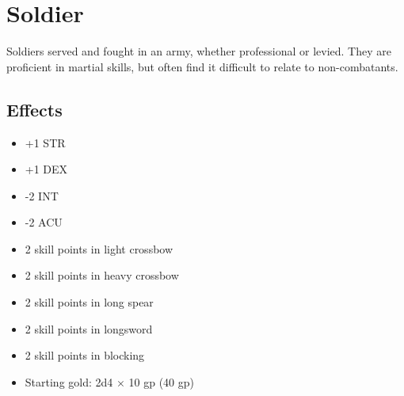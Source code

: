 \section{Soldier}\label{background:soldier}
Soldiers served and fought in an army, whether professional or levied. They
are proficient in martial skills, but often find it difficult to relate to
non-combatants.

\subsection{Effects}
\begin{itemize}
    \item +1 STR
    \item +1 DEX
    \item -2 INT
    \item -2 ACU
    \item 2 skill points in light crossbow
    \item 2 skill points in heavy crossbow
    \item 2 skill points in long spear
    \item 2 skill points in longsword
    \item 2 skill points in blocking
    \item Starting gold: 2d4 $\times$ 10 gp (40 gp)
\end{itemize}
